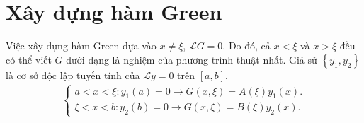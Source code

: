 \documentclass{report}
\begin{document}
\section{Xây dựng hàm Green}
Việc xây dựng hàm Green dựa vào $x \neq \xi$, $\mathcal{L} G = 0$. Do đó, cả $x < \xi$ và $x > \xi$ đều có thể viết $G$ dưới dạng là nghiệm của phương trình thuật nhất. Giả sử $\left\{y_1,y_2\right\}$ là cơ sở độc lập tuyến tính của $\mathcal{L} y =0$ trên $\left[a,b\right]$.
\begin{align}
	\begin{cases}
		a < x < \xi: y_1 (a) = 0\rightarrow G(x,\xi) = A(\xi) y_1 (x). \\
		\xi < x < b: y_2 (b) = 0\rightarrow G(x,\xi) = B(\xi) y_2 (x).
	\end{cases}
\end{align}
\end{document}
